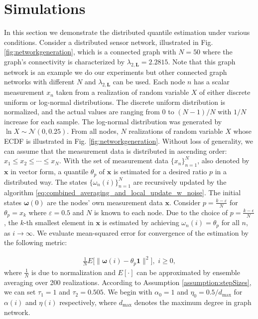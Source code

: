 \documentclass[journal]{IEEEtran}
\begin{document}
\section{Simulations} \label{simulations}
In this section we demonstrate the distributed quantile estimation under various conditions. Consider a distributed sensor network, illustrated in Fig. \ref{fig:networkgeneration}, which is a connected graph with $N=50$ where the graph's connectivity is characterized by $\lambda_{2,\mathbf{L}} = 2.2815$. Note that this graph network is an example we do our experiments but other connected graph networks with different $N$ and $\lambda_{2,\mathbf{L}}$ can be used. Each node $n$ has a scalar measurement $x_n$ taken from a realization of random variable $X$ of either discrete uniform or log-normal distributions. The discrete uniform distribution is normalized, and the actual values are ranging from $0$ to $(N-1)/N$ with $1/N$ increase for each sample. The log-normal distribution was generated by $\ln X \sim \mathcal{N}(0,0.25)$. From all nodes, $N$ realizations of random variable $X$ whose ECDF is illustrated in Fig. \ref{fig:networkgeneration}. Without loss of generality, we can assume that the measurement data is distributed in ascending order: $x_1 \le x_2 \le \cdots \le x_N$. With the set of measurement data $\{x_n\}_{n=1}^N$, also denoted by $\mathbf{x}$ in vector form, a quantile $\theta_p$ of $\mathbf{x}$ is estimated for a desired ratio $p$ in a distributed way. The states $\{\omega_n(i)\}_{n=1}^N$ are recursively updated by the algorithm \eqref{eq:combined_averaging_and_local_update_w_noise}. The initial states $\bm{\omega}(0)$ are the nodes' own measurement data $\mathbf{x}$. Consider $ p = \frac{k-\varepsilon}{N}$ for $\theta_p = x_k$ where $\varepsilon = 0.5$ and $N$ is known to each node. Due to the choice of $p = \frac{k-\epsilon}{N}$, the $k$-th smallest element in $\mathbf{x}$ is estimated by achieving $\omega_n(i) = \theta_p$ for all $n$, as $i \to \infty$. We evaluate mean-squared error for convergence of the estimation by the following metric: 

\vspace{-4mm}
\small
\begin{align}
\frac{1}{N} E \Big[\big\|\bm{\omega}(i) - \theta_p \mathbf{1}\big\|^2\Big],\,\,i \ge 0, \label{eq:theorem2_metric}
\end{align}
\normalsize
where $\frac{1}{N}$ is due to normalization and $E\left[\cdot\right]$ can be approximated by ensemble averaging over 200 realizations. According to Assumption \ref{assumption:stepSizes}, we can set $\tau_1 = 1$ and $\tau_2 = 0.505$. We begin with $\alpha_0 = 1$ and $\eta_0 = 0.5/d_\text{max}$ for $\alpha(i)$ and $\eta(i)$ respectively, where $d_\text{max}$ denotes the maximum degree in graph network. 
\end{document}
